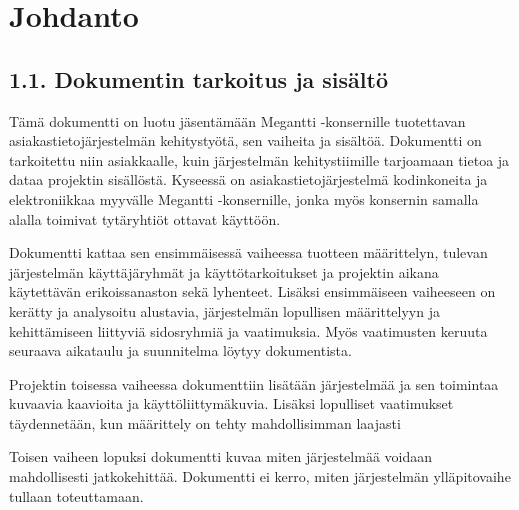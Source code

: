 \chapter{Johdanto} %
\label{johdanto} %
\thispagestyle{fancy} %

\section{1.1. Dokumentin tarkoitus ja sisältö} %

\begin{1.1.}

    Tämä dokumentti on luotu jäsentämään Megantti -konsernille tuotettavan asiakastietojärjestelmän kehitystyötä, sen vaiheita ja 
    sisältöä. Dokumentti on tarkoitettu niin asiakkaalle, kuin järjestelmän kehitystiimille tarjoamaan tietoa ja dataa projektin
    sisällöstä. Kyseessä on asiakastietojärjestelmä kodinkoneita ja elektroniikkaa myyvälle Megantti -konsernille, jonka myös 
    konsernin samalla alalla toimivat tytäryhtiöt ottavat käyttöön. 
        
    Dokumentti kattaa sen ensimmäisessä vaiheessa tuotteen määrittelyn, tulevan järjestelmän käyttäjäryhmät ja käyttötarkoitukset
    ja projektin aikana käytettävän erikoissanaston sekä lyhenteet. Lisäksi ensimmäiseen vaiheeseen on kerätty ja analysoitu alustavia,
    järjestelmän lopullisen määrittelyyn ja kehittämiseen liittyviä sidosryhmiä ja vaatimuksia. Myös vaatimusten keruuta seuraava
    aikataulu ja suunnitelma löytyy dokumentista.
        
    Projektin toisessa vaiheessa dokumenttiin lisätään järjestelmää ja sen toimintaa kuvaavia kaavioita ja käyttöliittymäkuvia. 
    Lisäksi lopulliset vaatimukset täydennetään, kun määrittely on tehty mahdollisimman laajasti
        
    Toisen vaiheen lopuksi dokumentti kuvaa miten järjestelmää voidaan mahdollisesti jatkokehittää.
    Dokumentti ei kerro, miten järjestelmän ylläpitovaihe tullaan toteuttamaan.

\end{1.1.}

